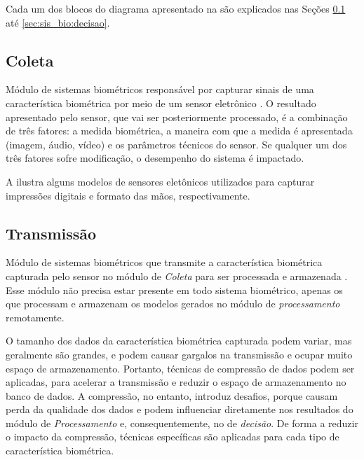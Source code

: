 \par Cada um dos blocos do diagrama apresentado na  são explicados nas Seções \ref{sec:sis_bio:coleta} até \ref{sec:sis_bio:decisao}.


\subsection{Coleta} \label{sec:sis_bio:coleta}

\par Módulo de sistemas biométricos responsável por capturar sinais de uma característica biométrica por meio de um sensor eletrônico \cite{wayman2005biometric}. O resultado apresentado pelo sensor, que vai ser posteriormente processado, é a combinação de três fatores: a medida biométrica, a maneira com que a medida é apresentada (imagem, áudio, vídeo) e os parâmetros técnicos do sensor. Se qualquer um dos três fatores sofre modificação, o desempenho do sistema é impactado.

\par A  ilustra alguns modelos de sensores eletônicos utilizados para capturar impressões digitais e formato das mãos, respectivamente.


\subsection{Transmissão}\label{sec:sis_bio:transmissao}

\par Módulo de sistemas biométricos que transmite a característica biométrica capturada pelo sensor no módulo de \textit{Coleta} para ser processada e armazenada \cite{wayman2005biometric}. Esse módulo não precisa estar presente em todo sistema biométrico, apenas os que processam e armazenam os modelos gerados no módulo de \textit{processamento} remotamente.

\par O tamanho dos dados da característica biométrica capturada podem variar, mas geralmente são grandes, e podem causar gargalos na transmissão e ocupar muito espaço de armazenamento. Portanto, técnicas de compressão de dados podem ser aplicadas, para acelerar a transmissão e reduzir o espaço de armazenamento no banco de dados. A compressão, no entanto, introduz desafios, porque causam perda da qualidade dos dados e podem influenciar diretamente nos resultados do módulo de \textit{Processamento} e, consequentemente, no de \textit{decisão}. De forma a reduzir o impacto da compressão, técnicas específicas são aplicadas para cada tipo de característica biométrica.

